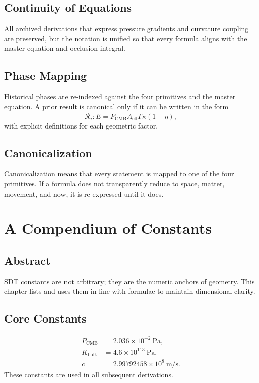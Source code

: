 \documentclass[12pt]{book}
\begin{document}
\section{Continuity of Equations}
All archived derivations that express pressure gradients and curvature coupling are preserved, but the
notation is unified so that every formula aligns with the master equation and occlusion integral.

\section{Phase Mapping}
Historical phases are re-indexed against the four primitives and the master equation. A prior result is
canonical only if it can be written in the form
\begin{equation}
\mathcal{R}_i: \dot{E} = P_{\text{CMB}} A_{\text{eff}} \Gamma \kappa (1-\eta),
\end{equation}
with explicit definitions for each geometric factor.

\section{Canonicalization}
Canonicalization means that every statement is mapped to one of the four primitives. If a formula does
not transparently reduce to space, matter, movement, and now, it is re-expressed until it does.

\chapter{A Compendium of Constants}

\section*{Abstract}
SDT constants are not arbitrary; they are the numeric anchors of geometry. This chapter lists and uses
them in-line with formulae to maintain dimensional clarity.

\section{Core Constants}
\begin{align}
P_{\text{CMB}} &= 2.036 \times 10^{-2}\ \text{Pa},\\
K_{\text{bulk}} &= 4.6 \times 10^{113}\ \text{Pa},\\
c &= 2.99792458 \times 10^8\ \text{m/s}.
\end{align}
These constants are used in all subsequent derivations.
\end{document}
